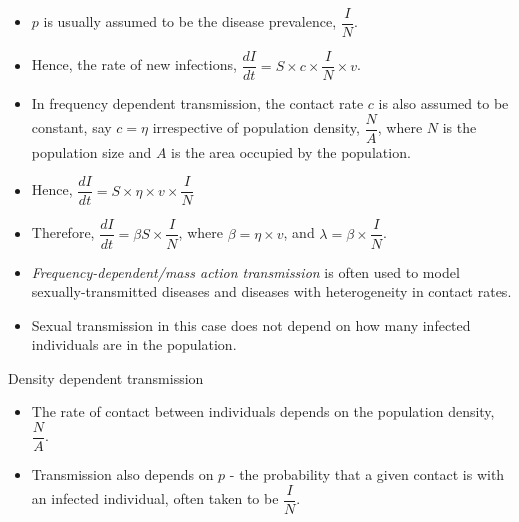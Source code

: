 \documentclass[
  ignorenonframetext,
]{beamer}
\providecommand{\tightlist}{%
  \setlength{\itemsep}{0pt}\setlength{\parskip}{0pt}}\usepackage{longtable,booktabs,array}
\begin{document}
\begin{frame}
\begin{itemize}
\item
  {\(p\)} is usually assumed to be the disease prevalence,
  {\(\dfrac{I}{N}\)}.
\item
  Hence, the rate of new infections,
  {\(\dfrac{dI}{dt} = S \times c \times \dfrac{I}{N}  \times v\)}.
\end{itemize}
\end{frame}

\begin{frame}
\begin{itemize}
\tightlist
\item
  In frequency dependent transmission, the contact rate {\(c\)} is also
  assumed to be constant, say {\(c = \eta\)} irrespective of population
  density, {\(\dfrac{N}{A}\)}, where {\(N\)} is the population size and
  {\(A\)} is the area occupied by the population.
\item
  Hence,
  {\(\dfrac{dI}{dt} = S \times \eta \times v \times \dfrac{I}{N}\)}
\item
  Therefore, {\(\dfrac{dI}{dt} = \beta S \times \dfrac{I}{N}\)}, where
  {\(\beta = \eta \times v\)}, and
  {\(\lambda = \beta \times \dfrac{I}{N}\)}.
\end{itemize}
\end{frame}

\begin{frame}
\begin{itemize}
\tightlist
\item
  {\emph{Frequency-dependent/mass action transmission}} is often used to
  model sexually-transmitted diseases and diseases with heterogeneity in
  contact rates.
\item
  Sexual transmission in this case does not depend on how many infected
  individuals are in the population.
\end{itemize}
\end{frame}

\begin{frame}
\begin{block}{Density dependent transmission}
\label{density-dependent-transmission}
\begin{itemize}
\item
  The rate of contact between individuals depends on the population
  density, {\(\dfrac{N}{A}\)}.
\item
  Transmission also depends on {\(p\)} - the probability that a given
  contact is with an infected individual, often taken to be
  {\(\dfrac{I}{N}\)}.
\end{itemize}
\end{block}
\end{frame}
\end{document}
